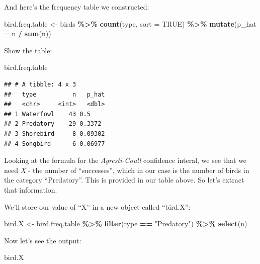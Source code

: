 \documentclass[
]{book}
\newenvironment{Shaded}{\begin{snugshade}}{\end{snugshade}}
\newcommand{\AttributeTok}[1]{\textcolor[rgb]{0.13,0.29,0.53}{#1}}
\newcommand{\ConstantTok}[1]{\textcolor[rgb]{0.56,0.35,0.01}{#1}}
\newcommand{\FunctionTok}[1]{\textcolor[rgb]{0.13,0.29,0.53}{\textbf{#1}}}
\newcommand{\NormalTok}[1]{#1}
\newcommand{\OtherTok}[1]{\textcolor[rgb]{0.56,0.35,0.01}{#1}}
\newcommand{\SpecialCharTok}[1]{\textcolor[rgb]{0.81,0.36,0.00}{\textbf{#1}}}
\newcommand{\StringTok}[1]{\textcolor[rgb]{0.31,0.60,0.02}{#1}}
\begin{document}
And here's the frequency table we constructed:

\begin{Shaded}
\begin{Highlighting}[]
\NormalTok{bird.freq.table }\OtherTok{\textless{}{-}}\NormalTok{ birds }\SpecialCharTok{\%\textgreater{}\%}
  \FunctionTok{count}\NormalTok{(type, }\AttributeTok{sort =} \ConstantTok{TRUE}\NormalTok{) }\SpecialCharTok{\%\textgreater{}\%} 
  \FunctionTok{mutate}\NormalTok{(}\AttributeTok{p\_hat =}\NormalTok{ n }\SpecialCharTok{/} \FunctionTok{sum}\NormalTok{(n))}
\end{Highlighting}
\end{Shaded}

Show the table:

\begin{Shaded}
\begin{Highlighting}[]
\NormalTok{bird.freq.table}
\end{Highlighting}
\end{Shaded}

\begin{verbatim}
## # A tibble: 4 x 3
##   type          n   p_hat
##   <chr>     <int>   <dbl>
## 1 Waterfowl    43 0.5    
## 2 Predatory    29 0.3372 
## 3 Shorebird     8 0.09302
## 4 Songbird      6 0.06977
\end{verbatim}

Looking at the formula for the \emph{Agresti-Coull} confidence interal, we see that we need \emph{X} - the number of ``successes'', which in our case is the number of birds in the category ``Predatory''. This is provided in our table above. So let's extract that information.

We'll store our value of ``X'' in a new object called ``bird.X'':

\begin{Shaded}
\begin{Highlighting}[]
\NormalTok{bird.X }\OtherTok{\textless{}{-}}\NormalTok{ bird.freq.table }\SpecialCharTok{\%\textgreater{}\%}
  \FunctionTok{filter}\NormalTok{(type }\SpecialCharTok{==} \StringTok{"Predatory"}\NormalTok{) }\SpecialCharTok{\%\textgreater{}\%}
  \FunctionTok{select}\NormalTok{(n)}
\end{Highlighting}
\end{Shaded}

Now let's see the output:

\begin{Shaded}
\begin{Highlighting}[]
\NormalTok{bird.X}
\end{Highlighting}
\end{Shaded}
\end{document}
